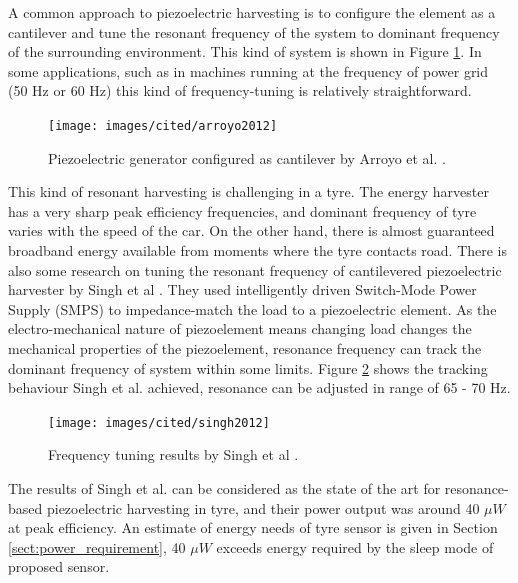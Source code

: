A common approach to piezoelectric harvesting is to configure the element as a cantilever and tune the resonant frequency of the system to dominant frequency of the surrounding environment. This kind of system is shown in Figure \ref{fiq:resonant_piezo}. In some applications, such as in machines running at the frequency of power grid (50 Hz or 60 Hz) this kind of frequency-tuning is relatively straightforward.

\begin{figure}[htb]
  \begin{center}
  \texttt{[image: images/cited/arroyo2012]}
  \end{center}
  \caption{Piezoelectric generator configured as cantilever by Arroyo et al. \cite{Arroyo2012}.}
  \label{fiq:resonant_piezo}
\end{figure}

This kind of resonant harvesting is challenging in a tyre. The energy harvester has a very sharp peak efficiency frequencies, and dominant frequency of tyre varies with the speed of the car. On the other hand, there is almost guaranteed broadband energy available from moments where the tyre contacts road. There is also some research on tuning the resonant frequency of cantilevered piezoelectric harvester by Singh et al \cite{Singh2012}. They used intelligently driven Switch-Mode Power Supply (SMPS) to impedance-match the load to a piezoelectric element. As the electro-mechanical nature of piezoelement means changing load changes the mechanical properties of the piezoelement, resonance frequency can track the dominant frequency of system within some limits. Figure \ref{fiq:tracking_piezo} shows the tracking behaviour Singh et al. achieved, resonance can be adjusted in range of 65 - 70 Hz.

\begin{figure}[htb]
  \begin{center}
  \texttt{[image: images/cited/singh2012]}
  \end{center}
  \caption{Frequency tuning results by Singh et al \cite{Singh2012}.}
  \label{fiq:tracking_piezo}
\end{figure}

The results of Singh et al. can be considered as the state of the art for resonance-based piezoelectric harvesting in tyre, and their power output was around 40 $\mu W$ at peak efficiency. An estimate of energy needs of tyre sensor is given in Section \ref{sect:power_requirement}, 40 $\mu W$ exceeds energy required by the sleep mode of proposed sensor.

